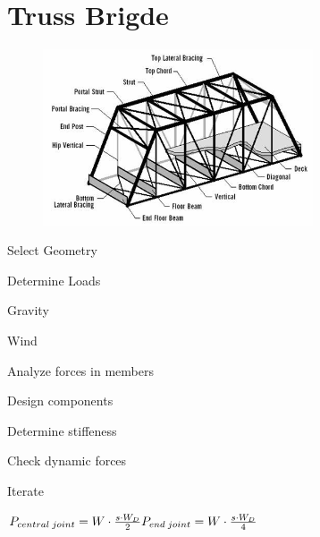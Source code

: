 \documentclass{article}
\newcommand{\SubItem}[1]{
    {\setlength\itemindent{15pt} \item[-] #1}
}
\begin{document}
    \section{Truss Brigde}
        \begin{figure}[H]
            \centering
            \includegraphics[width=8cm]{TrussBridge.jpeg}
        \end{figure}
        \begin{enumerate}
            \item Select Geometry
            \item Determine Loads
                \SubItem{Gravity}
                \SubItem{Wind}
            \item Analyze forces in members
            \item Design components
            \item Determine stiffeness
            \item Check dynamic forces 
            \item Iterate
        \end{enumerate}
        \begin{math}
            P_{central\;joint}= W \cdot \frac{s\cdot W_D}{2} \\
            P_{end\;joint}= W \cdot \frac{s\cdot W_D}{4} 
        \end{math}
    
\end{document}
